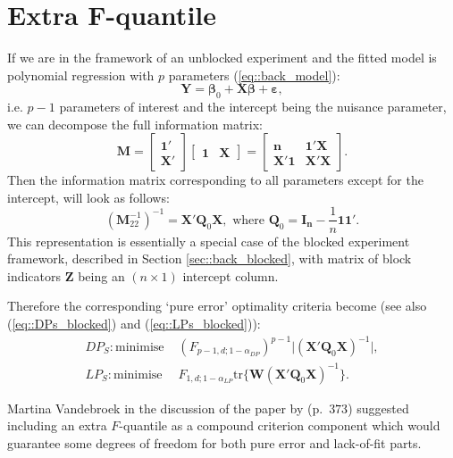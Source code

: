 \section{Extra F-quantile}
\label{sec::extraF}
If we are in the framework of an unblocked experiment and the fitted model is polynomial regression with $p$ parameters (\ref{eq::back_model}):
\begin{equation*}
\bm{Y}=\bm{\beta}_{0}+\bm{X\beta}+\bm{\varepsilon},
\end{equation*}
i.e. $p-1$ parameters of interest and the intercept being the nuisance parameter, we can decompose the full information matrix:
\begin{equation*}
\bm{M}=\left[ \begin{array}{c}\bm{1'}\\\bm{X'}\end{array} \right]\left[\begin{array}{cc}\bm{1} & \bm{X}\end{array}\right]=\left[\begin{array}{cc}
\bm{n} & \bm{1'X}\\ \bm{X'1} & \bm{X'X} 
\end{array}  \right].
\end{equation*}
Then the information matrix corresponding to all parameters except for the intercept, will look as follows:
\begin{equation}
\label{eq::s_infmatrix}
(\bm{M}^{-1}_{22})^{-1}=\bm{X'}\bm{Q}_{0}\bm{X}, \mbox{ where }\bm{Q}_{0}=\bm{I_n}-\frac{1}{n}\bm{11'}.  
\end{equation}
This representation is essentially a special case of the blocked experiment framework, described in Section \ref{sec::back_blocked}, with matrix of block indicators $\bm{Z}$ being an $(n\times 1)$ intercept column. 

Therefore the corresponding `pure error' optimality criteria  become (see also (\ref{eq::DPs_blocked}) and (\ref{eq::LPs_blocked})): 
\begin{align}
\label{eq::DPs_inter}
DP_S: \mbox{minimise } &(F_{p-1,d;1-\alpha_{DP}})^{p-1}\vert (\bm{X'}\bm{Q}_{0}\bm{X})^{-1}\vert,\\
\label{eq::LPs_inter}
LP_S: \mbox{minimise } &F_{1,d;1-\alpha_{LP}}\mbox{tr}\{\bm{W}(\bm{X'}\bm{Q}_{0}\bm{X})^{-1}\}.
\end{align}

Martina Vandebroek in the discussion of the paper by \cite{GilmourTrinca2012} (p.~$373$) suggested including an extra $F$-quantile as a compound criterion component which would guarantee some degrees of freedom for both pure error and lack-of-fit parts. 

